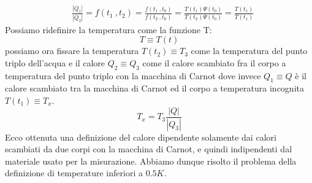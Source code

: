 \documentclass[10pt,a4paper]{article}
\begin{document}
\begin{align*}
&\frac{|Q_1|}{|Q_2|} = f(t_1\ , t_2) = \frac{f(t_1\ ,t_0)}{f(t_2\ ,t_0)}= \frac{T(t_1)\Psi(t_0)}{T(t_2)\Psi(t_0)}=\frac{T(t_1)}{T(t_1)}
\end{align*}
Possiamo ridefinire la temperatura come la funzione T: \[T \equiv T(t)\]
possiamo ora fissare la temperatura $T(t_2)\equiv T_3$ come la temperatura del punto triplo dell'acqua e il calore \(Q_2\equiv Q_3\) come il calore scambiato fra il corpo a temperatura del punto triplo con la macchina di Carnot dove invece \(Q_1\equiv Q\) è il calore scambiato tra la macchina di Carnot ed il corpo a temperatura incognita \(T(t_1)\equiv T_x\). 
\[T_x = T_3\frac{|Q|}{|Q_3|}\]
Ecco ottenuta una definizione del calore dipendente solamente dai calori scambiati da due corpi con la macchina di Carnot, e quindi indipendenti dal materiale usato per la misurazione. Abbiamo dunque risolto il problema della definizione di temperature inferiori a \(0.5 K\). 
\end{document}
